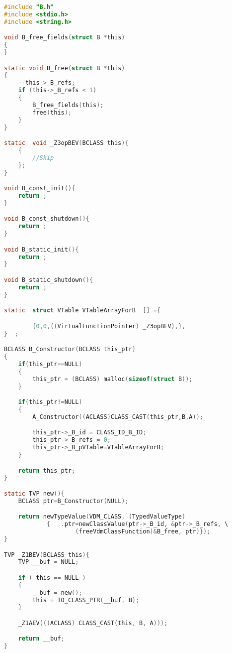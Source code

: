 \begin{lstlisting}[language=C,frame=tlbr,caption="File B.c."]
#include "B.h"
#include <stdio.h>
#include <string.h>

void B_free_fields(struct B *this)
{
}

static void B_free(struct B *this)
{
	--this->_B_refs;
	if (this->_B_refs < 1)
	{
		B_free_fields(this);
		free(this);
	}
}

static  void _Z3opBEV(BCLASS this){
	{
		//Skip
	};
}

void B_const_init(){
	return ;
}

void B_const_shutdown(){
	return ;
}

void B_static_init(){
	return ;
}

void B_static_shutdown(){
	return ;
}

static  struct VTable VTableArrayForB  [] ={

		{0,0,((VirtualFunctionPointer) _Z3opBEV),},
}  ;

BCLASS B_Constructor(BCLASS this_ptr)
{
	if(this_ptr==NULL)
	{
		this_ptr = (BCLASS) malloc(sizeof(struct B));
	}

	if(this_ptr!=NULL)
	{
		A_Constructor((ACLASS)CLASS_CAST(this_ptr,B,A));

		this_ptr->_B_id = CLASS_ID_B_ID;
		this_ptr->_B_refs = 0;
		this_ptr->_B_pVTable=VTableArrayForB;
	}

	return this_ptr;
}

static TVP new(){
	BCLASS ptr=B_Constructor(NULL);

	return newTypeValue(VDM_CLASS, (TypedValueType)
			{	.ptr=newClassValue(ptr->_B_id, &ptr->_B_refs, \
					(freeVdmClassFunction)&B_free, ptr)});
}

TVP _Z1BEV(BCLASS this){
	TVP __buf = NULL;

	if ( this == NULL )
	{
		__buf = new();
		this = TO_CLASS_PTR(__buf, B);
	}

	_Z1AEV(((ACLASS) CLASS_CAST(this, B, A)));

	return __buf;
}

\end{lstlisting}
%
%
%
